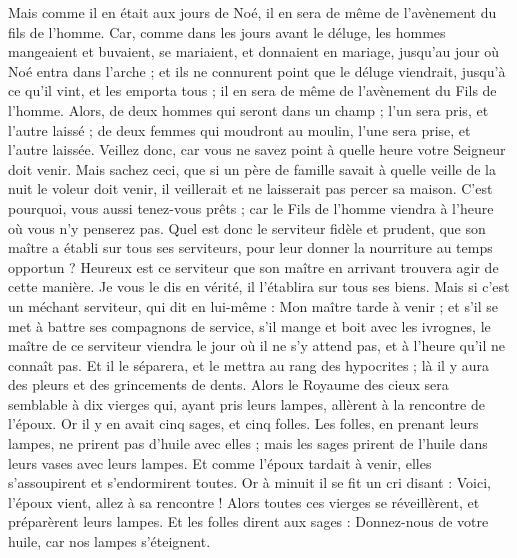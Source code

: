 \begin{multicols}{2}
Mais comme il en était aux jours de Noé, il en sera de même de l'avènement du fils de l'homme.
Car, comme dans les jours avant le déluge, les hommes mangeaient et buvaient, se mariaient, et donnaient en mariage, jusqu'au jour où Noé entra dans l'arche ;
et ils ne connurent point que le déluge viendrait, jusqu'à ce qu'il vint, et les emporta tous ; il en sera de même de l'avènement du Fils de l'homme.
Alors, de deux hommes qui seront dans un champ ; l'un sera pris, et l'autre laissé ;
de deux femmes qui moudront au moulin, l'une sera prise, et l'autre laissée.
Veillez donc, car vous ne savez point à quelle heure votre Seigneur doit venir.
Mais sachez ceci, que si un père de famille savait à quelle veille de la nuit le voleur doit venir, il veillerait et ne laisserait pas percer sa maison.
C'est pourquoi, vous aussi tenez-vous prêts ; car le Fils de l'homme viendra à l'heure où vous n'y penserez pas.
Quel est donc le serviteur fidèle et prudent, que son maître a établi sur tous ses serviteurs, pour leur donner la nourriture au temps opportun ?
Heureux est ce serviteur que son maître en arrivant trouvera agir de cette manière.
Je vous le dis en vérité, il l'établira sur tous ses biens.
Mais si c'est un méchant serviteur, qui dit en lui-même : Mon maître tarde à venir ;
et s'il se met à battre ses compagnons de service, s'il mange et boit avec les ivrognes,
le maître de ce serviteur viendra le jour où il ne s'y attend pas, et à l'heure qu'il ne connaît pas.
Et il le séparera, et le mettra au rang des hypocrites ; là il y aura des pleurs et des grincements de dents.
\VerseOne{}Alors le Royaume des cieux sera semblable à dix vierges qui, ayant pris leurs lampes, allèrent à la rencontre de l'époux.
Or il y en avait cinq sages, et cinq folles.
Les folles, en prenant leurs lampes, ne prirent pas d'huile avec elles ;
mais les sages prirent de l'huile dans leurs vases avec leurs lampes.
Et comme l'époux tardait à venir, elles s'assoupirent et s'endormirent toutes.
Or à minuit il se fit un cri disant : Voici, l'époux vient, allez à sa rencontre !
Alors toutes ces vierges se réveillèrent, et préparèrent leurs lampes.
Et les folles dirent aux sages : Donnez-nous de votre huile, car nos lampes s'éteignent.

\end{multicols}

